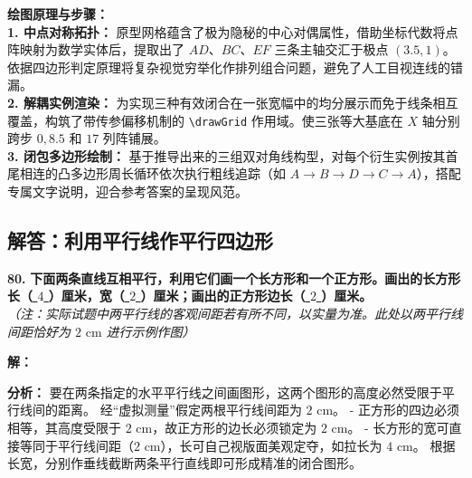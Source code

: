 \vspace{0.4cm}
{\small\color{blue!70!black}
\textbf{绘图原理与步骤：}\\
\textbf{1. 中点对称拓扑：} 原型网格蕴含了极为隐秘的中心对偶属性，借助坐标代数将点阵映射为数学实体后，提取出了 $AD$、$BC$、$EF$ 三条主轴交汇于极点 $(3.5, 1)$。依据四边形判定原理将复杂视觉穷举化作排列组合问题，避免了人工目视连线的错漏。\\
\textbf{2. 解耦实例渲染：} 为实现三种有效闭合在一张宽幅中的均分展示而免于线条相互覆盖，构筑了带传参偏移机制的 \texttt{\textbackslash drawGrid} 作用域。使三张等大基底在 $X$ 轴分别跨步 $0, 8.5$ 和 $17$ 列阵铺展。\\
\textbf{3. 闭包多边形绘制：} 基于推导出来的三组双对角线构型，对每个衍生实例按其首尾相连的凸多边形周长循环依次执行粗线追踪（如 $A\to B\to D\to C\to A$），搭配专属文字说明，迎合参考答案的呈现风范。
}

\newpage

\newpage

\subsection{解答：利用平行线作平行四边形}

\vspace{0.6cm}

\textbf{\LARGE 80.} \textbf{下面两条直线互相平行，利用它们画一个长方形和一个正方形。画出的长方形长（\underline{ $4$ }）厘米，宽（\underline{ $2$ }）厘米；画出的正方形边长（\underline{ $2$ }）厘米。}
\\ \textit{（注：实际试题中两平行线的客观间距若有所不同，以实量为准。此处以两平行线间距恰好为 $2\text{ cm}$ 进行示例作图）}

\vspace{0.4cm}
\textbf{解：}

\textbf{分析：}
要在两条指定的水平平行线之间画图形，这两个图形的高度必然受限于平行线间的距离。
经“虚拟测量”假定两根平行线间距为 $2\text{ cm}$。
- 正方形的四边必须相等，其高度受限于 $2\text{ cm}$，故正方形的边长必须锁定为 $2\text{ cm}$。
- 长方形的宽可直接等同于平行线间距（$2\text{ cm}$），长可自己视版面美观定夺，如拉长为 $4\text{ cm}$。
根据长宽，分别作垂线截断两条平行直线即可形成精准的闭合图形。


